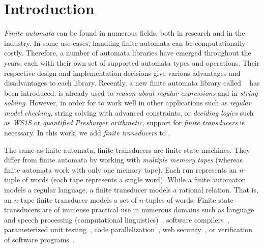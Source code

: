 
% 

\chapter{Introduction}

\emph{Finite automata} can be found in numerous fields, both in research and in the industry.
In some use cases, handling finite automata can be computationally costly.
Therefore, a number of automata libraries have emerged throughout the years, each with their own set of supported automata types and operations.
Their respective design and implementation decisions give various advantages and disadvantages to each library.
Recently, a new finite automata library called \mata~\cite{tacas24_mata_10.1007/978-3-031-57249-4_7} has been introduced.
\mata is already used to \emph{reason about regular expressions} and in \emph{string solving}.
However, in order for \mata to work well in other applications such as \emph{regular model checking}, string solving with advanced constraints, or \emph{deciding logics} such as \emph{WS1S} or \emph{quantified Presburger arithmetic}, support for \emph{finite transducers} is necessary.
In this work, we add \emph{finite transducers} to \mata.

The same as finite automata, finite transducers are finite state machines.
They differ from finite automata by working with \emph{multiple memory tapes} (whereas finite automata work with only one memory tape).
Each run represents an $n$-tuple of words (each tape represents a single word).
While a finite automaton models a regular language, a finite transducer models a rational relation.
That is, an $n$-tape finite transducer models a set of $n$-tuples of words.
Finite state transducers are of immense practical use in numerous domains such as language and speech processing (computational linguistics)~\cite{DBLP:journals/coling/Mohri97}, software compilers~\cite{compilers}, parameterized unit testing~\cite{DBLP:conf/icst/VeanesHT10}, code parallelization~\cite{DBLP:journals/nle/Watson96}, web security~\cite{DBLP:conf/uss/HooimeijerLMSV11}, or verification of software programs~\cite{DBLP:books/ws/automata12}.

